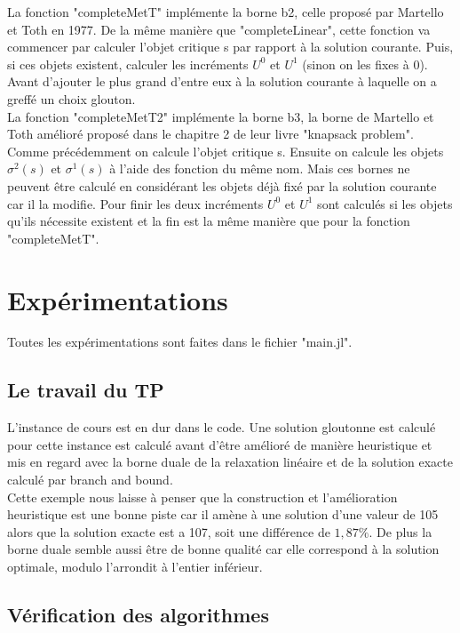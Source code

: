 \documentclass[12pt,a4paper]{article}
\begin{document}
La fonction "completeMetT" implémente la borne b2, celle proposé par Martello et Toth en 1977. De la même manière que "completeLinear", cette fonction va commencer par calculer l'objet critique s par rapport à la solution courante. Puis, si ces objets existent, calculer les incréments $U^0$ et $U^1$ (sinon on les fixes à 0). Avant d'ajouter le plus grand d'entre eux à la solution courante à laquelle on a greffé un choix glouton.\\

La fonction "completeMetT2" implémente la borne b3, la borne de Martello et Toth amélioré proposé dans le chapitre 2 de leur livre "knapsack problem". Comme précédemment on calcule l'objet critique s. Ensuite on calcule les objets $\sigma^2(s)$ et $\sigma^1(s)$ à l'aide des fonction du même nom. Mais ces bornes ne peuvent être calculé en considérant les objets déjà fixé par la solution courante car il la modifie. Pour finir les deux incréments $U^0$ et $U^1$ sont calculés si les objets qu'ils nécessite existent et la fin est la même manière que pour la fonction "completeMetT".\\

\section{Expérimentations}
Toutes les expérimentations sont faites dans le fichier "main.jl". \\

\subsection{Le travail du TP}

L'instance de cours est en dur dans le code. Une solution gloutonne est calculé pour cette instance est calculé avant d’être amélioré de manière heuristique et mis en regard avec la borne duale de la relaxation linéaire et de la solution exacte calculé par branch and bound.\\

Cette exemple nous laisse à penser que la construction et l'amélioration heuristique est une bonne piste car il amène à une solution d'une valeur de 105 alors que la solution exacte est a 107, soit une différence de $1,87 \%$. De plus la borne duale semble aussi être de bonne qualité car elle correspond à la solution optimale, modulo l’arrondit à l'entier inférieur.\\

\subsection{Vérification des algorithmes}
\end{document}
